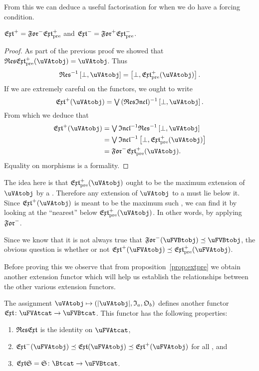 \documentclass[%
a4paper,%
arxiv,%
defaults
]{myclass}
\begin{document}
From this we can deduce a useful factorisation for when we do have a forcing condition.

\begin{corollary}
\(\Jextfunc = \Jforfunc \Jextfunc_\pre\) and \(\Mextfunc = \Mforfunc \Mextfunc_\pre\).
\end{corollary}

\begin{proof}
As part of the previous proof we showed that \(\resfunc \Jextfunc_\pre(\uVAtobj) = \uVAtobj\).
Thus
%
\[
  \resfunc^{-1} \left[\bot, \uVAtobj\right] = \left[\bot, \Jextfunc_\pre(\uVAtobj)\right].
\]
%
If we are extremely careful on the functors, we ought to write
%
\[
  \Jextfunc(\uVAtobj) = \join (\resfunc \incfunc)^{-1} \left[\bot,\uVAtobj \right].
\]
%
From which we deduce that
%
\begin{align*}
  \Jextfunc(\uVAtobj) &= \join \incfunc^{-1} \resfunc^{-1} \left[\bot, \uVAtobj \right] \\
%
&= \join \incfunc^{-1} \left[\bot, \Jextfunc_\pre(\uVAtobj) \right] \\
%
&= \Jforfunc \Jextfunc_\pre(\uVAtobj).
\end{align*}
%
Equality on morphisms is a formality.
\end{proof}


The idea here is that \(\Jextfunc_\pre(\uVAtobj)\) ought to be the maximum extension of \(\uVAtobj\) by a \uFVBtobj.
Therefore any extension of \(\uVAtobj\) to a \uFVBtobj must lie below it.
Since \(\Jextfunc(\uVAtobj)\) is meant to be the maximum such \uFVBtobj, we can find it by looking at the ``nearest'' \uFVBtobj below \(\Jextfunc_\pre(\uVAtobj)\).
In other words, by applying \(\Jforfunc\).

Since we know that it is not always true that \(\Jforfunc(\uFVBtobj) \preceq \uFVBtobj\), the obvious question is whether or not \(\Jextfunc(\uFVAtobj) \preceq \PJextfunc(\uFVAtobj)\).

Before proving this we observe that from proposition~\ref{prop:extpre} we obtain another extension functor which will help us establish the relationships between the other various extension functors.

\begin{lemma}
The assignment \(\uVAtobj \mapsto (\forfunc[\uVAtobj], \itest_a, \otest_b)\) defines another functor \(\extfunc \colon \uFVAtcat \to \uFVBtcat\).
This functor has the following properties:
%
\begin{enumerate}
\item \(\resfunc \extfunc\) is the identity on \(\uFVAtcat\),
\item \(\Mextfunc(\uFVAtobj) \preceq \extfunc(\uFVAtobj) \preceq \Jextfunc(\uFVAtobj)\) for all \uFVAtobjs[\uFVAtobj], and
\item \(\extfunc \sfunc = \sfunc \colon \Btcat \to \uFVBtcat\).
\end{enumerate}
\end{lemma}
\end{document}
